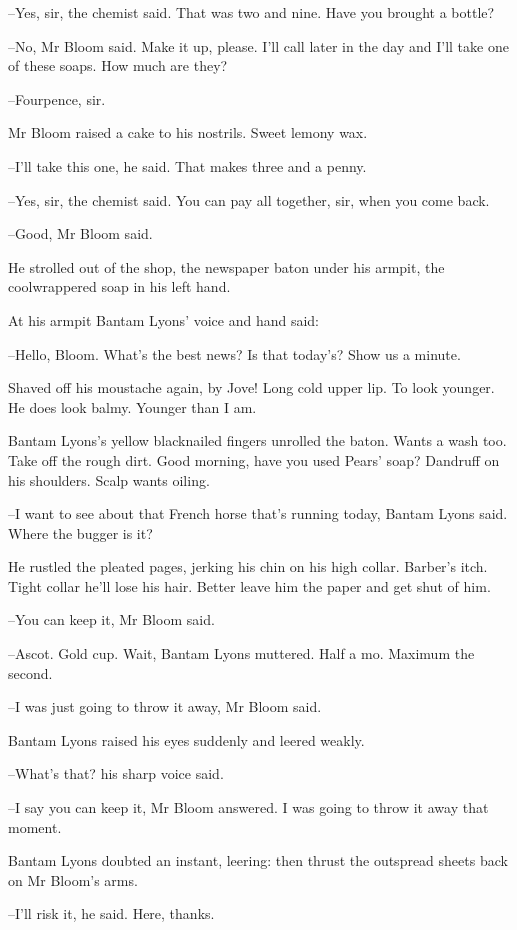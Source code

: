 --Yes, sir, the chemist said. That was two and nine. Have you brought a
bottle?

--No, Mr Bloom said. Make it up, please. I'll call later in the day and
I'll take one of these soaps. How much are they?

--Fourpence, sir.

Mr Bloom raised a cake to his nostrils. Sweet lemony wax.

--I'll take this one, he said. That makes three and a penny.

--Yes, sir, the chemist said. You can pay all together, sir, when you
come back.

--Good, Mr Bloom said.

He strolled out of the shop, the newspaper baton under his armpit,
the coolwrappered soap in his left hand.

At his armpit Bantam Lyons' voice and hand said:

--Hello, Bloom. What's the best news? Is that today's? Show us a minute.

Shaved off his moustache again, by Jove! Long cold upper lip. To
look younger. He does look balmy. Younger than I am.

Bantam Lyons's yellow blacknailed fingers unrolled the baton. Wants
a wash too. Take off the rough dirt. Good morning, have you used Pears'
soap? Dandruff on his shoulders. Scalp wants oiling.

--I want to see about that French horse that's running today, Bantam
Lyons said. Where the bugger is it?

He rustled the pleated pages, jerking his chin on his high collar.
Barber's itch. Tight collar he'll lose his hair. Better leave him the
paper and get shut of him.

--You can keep it, Mr Bloom said.

--Ascot. Gold cup. Wait, Bantam Lyons muttered. Half a mo. Maximum
the second.

--I was just going to throw it away, Mr Bloom said.

Bantam Lyons raised his eyes suddenly and leered weakly.

--What's that? his sharp voice said.

--I say you can keep it, Mr Bloom answered. I was going to throw it away
that moment.

Bantam Lyons doubted an instant, leering: then thrust the outspread
sheets back on Mr Bloom's arms.

--I'll risk it, he said. Here, thanks.

